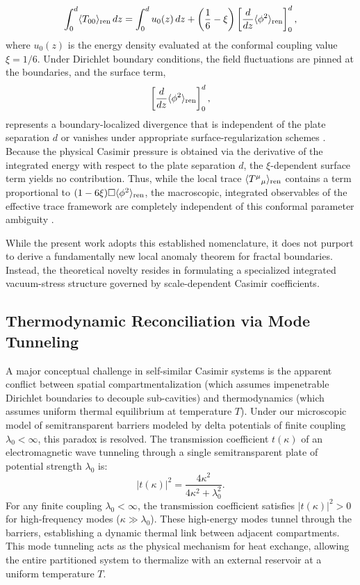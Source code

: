 \documentclass[12pt,letterpaper]{article}
\begin{document}
{\begin{equation}
\int_{0}^{d} \langle T_{00} \rangle_{\rm ren} \, dz = \int_{0}^{d} u_0(z) \, dz + \left( \frac{1}{6} - \xi \right) \left[ \frac{d}{dz} \langle \phi^2 \rangle_{\rm ren} \right]_{0}^{d},
\label{eq:integrated_energy_conformal}
\end{equation}
where $u_0(z)$ is the energy density evaluated at the conformal coupling value $\xi = 1/6$. Under Dirichlet boundary conditions, the field fluctuations are pinned at the boundaries, and the surface term,
\begin{equation}
\left[ \frac{d}{dz} \langle \phi^2 \rangle_{\rm ren} \right]_{0}^{d},
\label{eq:surface_divergence}
\end{equation}
represents a boundary-localized divergence that is independent of the plate separation $d$ or vanishes under appropriate surface-regularization schemes \cite{milton2016}. Because the physical Casimir pressure is obtained via the derivative of the integrated energy with respect to the plate separation $d$, the $\xi$-dependent surface term yields no contribution. Thus, while the local trace $\langle T^\mu{}_\mu \rangle_{\rm ren}$ contains a term proportional to $(1-6\xi)\Box \langle \phi^2 \rangle_{\rm ren}$, the macroscopic, integrated observables of the effective trace framework are completely independent of this conformal parameter ambiguity \cite{milton2016}.}

While the present work adopts this established nomenclature, it does not purport to derive a fundamentally new local anomaly theorem for fractal boundaries.
Instead, the theoretical novelty resides in formulating a specialized integrated vacuum-stress structure governed by scale-dependent Casimir coefficients.

\subsection{Thermodynamic Reconciliation via Mode Tunneling}
A major conceptual challenge in self-similar Casimir systems is the apparent conflict between spatial compartmentalization (which assumes impenetrable Dirichlet boundaries to decouple sub-cavities) and thermodynamics (which assumes uniform thermal equilibrium at temperature $T$). Under our microscopic model of semitransparent barriers modeled by delta potentials of finite coupling $\lambda_0 < \infty$, this paradox is resolved. The transmission coefficient $t(\kappa)$ of an electromagnetic wave tunneling through a single semitransparent plate of potential strength $\lambda_0$ is:
\begin{equation}
|t(\kappa)|^2 = \frac{4\kappa^2}{4\kappa^2 + \lambda_0^2}.
\label{eq:SI_trans}
\end{equation}
For any finite coupling $\lambda_0 < \infty$, the transmission coefficient satisfies $|t(\kappa)|^2 > 0$ for high-frequency modes ($\kappa \gg \lambda_0$). These high-energy modes tunnel through the barriers, establishing a dynamic thermal link between adjacent compartments. This mode tunneling acts as the physical mechanism for heat exchange, allowing the entire partitioned system to thermalize with an external reservoir at a uniform temperature $T$. 
\end{document}
